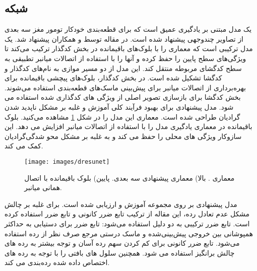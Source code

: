 \subsection{ شبکه }
 یک مدل مبتنی بر یادگیری عمیق است که برای قطعه‌بندی خودکار تومور مغز سه بعدی از تصاویر  چندوجهی پیشنهاد شده است.  در مقاله \cite{raza2023dresu}توسط و همکاران پیشنهاد شد.  یک مدل ترکیبی است که معماری  را با بلوک‌های باقیمانده در بخش کدگذار ترکیب می‌کند تا ویژگی‌های سطح پایین را حفظ کرده و آنها را با استفاده از اتصالات میانبر تطبیقی به سطح کدگشای مربوطه منتقل کند. این مدل از دو مسیر موازی به نام‌های کدگذار و کدگشا تشکیل شده است. در بخش کدگذار، بلوک‌های پیچشی باقیمانده برای بهره‌برداری از اتصالات میانبر برای پیش‌بینی ماسک‌های قطعه‌بندی استفاده می‌شوند. بخش کدگشا برای بازسازی تصویر اصلی از ویژگی های کدگذاری شده استفاده می شود. مدل پیشنهادی برای بهبود فرآیند کلی آموزش و غلبه بر مشکل ناپدید شدن گرادیان طراحی شده است. معماری این مدل را در شکل \ref{fig:dresunet} مشاهده می‌کنید. بلوک باقیمانده در معماری  یادگیری مدل را با استفاده از اتصالات میانبر افزایش می دهد. این سازوکار ویژگی های محلی را حفظ می کند و به غلبه بر مشکل محو شدگی‌گرادیان کمک می کند. 
\begin{figure}[h]
\centerline{\texttt{[image: images/dresunet]}}
\caption[\hspace{0.5em}معماری ]{معماری . بالا) معماری پیشنهادی  سه بعدی. پایین) بلوک باقیمانده با اتصال همانی میانبر.\cite{raza2023dresu}}
\label{fig:dresunet}
\end{figure}

مدل پیشنهادی  بر روی مجموعه  آموزش و ارزیابی شده است.  برای غلبه بر چالش مشکل عدم تعادل رده، این مقاله از ترکیب تابع ضرر کانونی و تابع ضرر استفاده کرده است. تابع ضرر ترکیبی به دو دلیل استفاده می‌شود: تابع ضرر  برای دستیابی به حداکثر همپوشانی بین خروجی پیش‌بینی‌شده و ماسک درستی مرجع صرف نظر از رده استفاده می‌شود. تابع ضرر کانونی برای کم کردن سهم رده آسان و توجه بیشتر به رده های چالش برانگیز استفاده می شود. همچنین سلول های بافتی را با توجه به رده های اختصاص داده شده رده‌بندی می کند.

